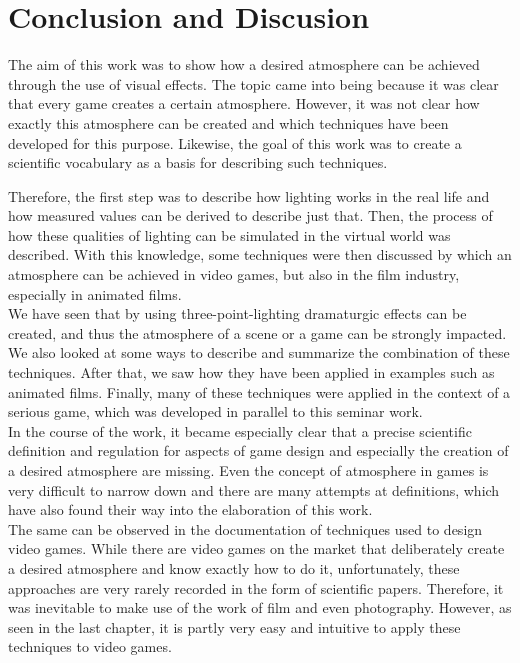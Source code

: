 \chapter{Conclusion and Discusion}
The aim of this work was to show how a desired atmosphere can be achieved through the use of visual effects. The topic came into being because it was clear that every game creates a certain atmosphere. However, it was not clear how exactly this atmosphere can be created and which techniques have been developed for this purpose. Likewise, the goal of this work was to create a scientific vocabulary as a basis for describing such techniques. 

Therefore, the first step was to describe how lighting works in the real life and how measured values can be derived to describe just that. Then, the process of how these qualities of lighting can be simulated in the virtual world was described. With this knowledge, some techniques were then discussed by which an atmosphere can be achieved in video games, but also in the film industry, especially in animated films. \\
We have seen that by using three-point-lighting dramaturgic effects can be created, and thus the atmosphere of a scene or a game can be strongly impacted. We also looked at some ways to describe and summarize the combination of these techniques. After that, we saw how they have been applied in examples such as animated films. Finally, many of these techniques were applied in the context of a serious game, which was developed in parallel to this seminar work. \\
In the course of the work, it became especially clear that a precise scientific definition and regulation for aspects of game design and especially the creation of a desired atmosphere are missing. Even the concept of atmosphere in games is very difficult to narrow down and there are many attempts at definitions, which have also found their way into the elaboration of this work. \\
The same can be observed in the documentation of techniques used to design video games. While there are video games on the market that deliberately create a desired atmosphere and know exactly how to do it, unfortunately, these approaches are very rarely recorded in the form of scientific papers. Therefore, it was inevitable to make use of the work of film and even photography. However, as seen in the last chapter, it is partly very easy and intuitive to apply these techniques to video games.\\
